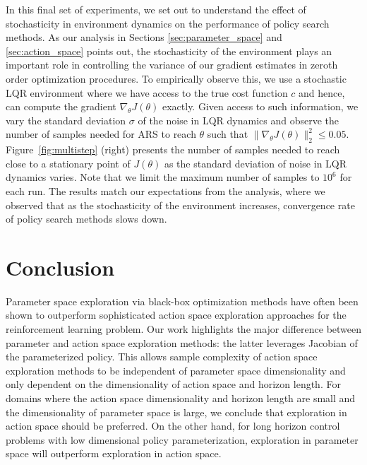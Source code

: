 In this final set of experiments, we set out to understand the effect
of stochasticity in environment dynamics on the performance of
policy search methods. As our analysis in Sections
\ref{sec:parameter_space} and \ref{sec:action_space} points out, the
stochasticity of the environment plays an important role in
controlling the variance of our gradient estimates in zeroth order
optimization procedures. To empirically observe this, we use a
stochastic LQR environment where we have access to the true cost
function $c$ and hence, can compute the gradient $\nabla_\theta
J(\theta)$ exactly. Given access to such information, we vary the
standard deviation $\sigma$ of the noise in LQR dynamics and observe the number of samples needed for
ARS to reach $\theta$ such that
$\|\nabla_\theta J(\theta)\|_2^2 \leq 0.05$.
%
%
%
%
%
%
%
%
Figure~\ref{fig:multistep} (right) presents the number of samples needed to reach
close to a stationary point of $J(\theta)$ as the standard deviation
of noise in LQR dynamics varies. 
%
%
%
Note that we limit the maximum number of
samples to $10^6$ for each run. The results match our expectations from
the analysis, where we observed
that as the stochasticity of the environment increases, convergence
rate of policy search methods slows down.

\section{Conclusion}
\label{sec:conclusion}

Parameter space exploration via black-box optimization methods have
often been shown to outperform sophisticated action space exploration approaches for the reinforcement learning problem. Our work highlights the major difference between parameter and action space exploration methods: the latter leverages 
%
Jacobian of the parameterized policy. This allows sample complexity of action space exploration methods to be independent of parameter space dimensionality and only dependent on the dimensionality of action space and horizon length. For domains where the action space dimensionality and horizon length are small and the dimensionality of parameter space is large,
%
we conclude that exploration in action space should be preferred. On
the other hand, for long horizon control problems with low dimensional
policy parameterization, exploration in parameter space will
outperform exploration in action space.


